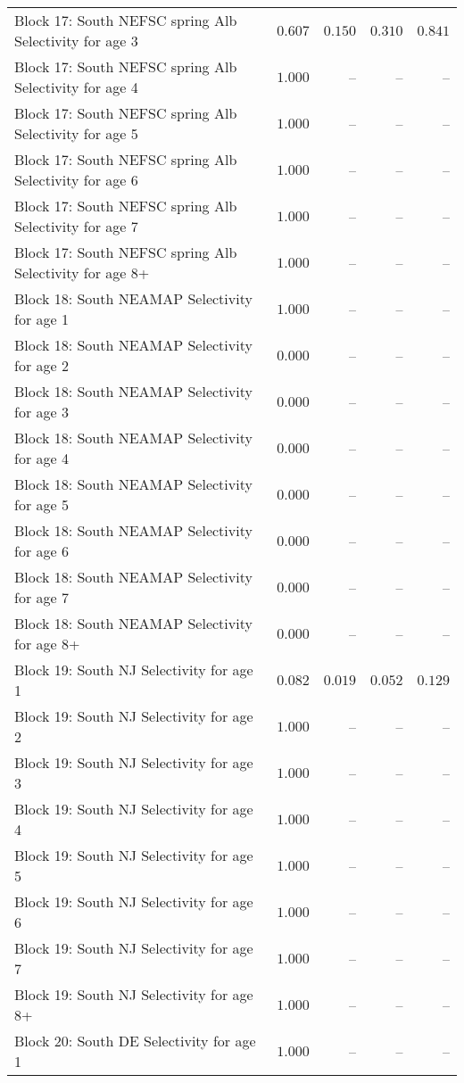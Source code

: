 \documentclass[
]{article}
\begin{document}
\begin{landscape}
\begin{longtable}[t]{lrrrr}
Block 17: South NEFSC spring Alb Selectivity for age 3 & $0.607$ & $0.150$ & $0.310$ & $0.841$\\
Block 17: South NEFSC spring Alb Selectivity for age 4 & $1.000$ & -- & -- & --\\
Block 17: South NEFSC spring Alb Selectivity for age 5 & $1.000$ & -- & -- & --\\
\addlinespace
Block 17: South NEFSC spring Alb Selectivity for age 6 & $1.000$ & -- & -- & --\\
Block 17: South NEFSC spring Alb Selectivity for age 7 & $1.000$ & -- & -- & --\\
Block 17: South NEFSC spring Alb Selectivity for age 8+ & $1.000$ & -- & -- & --\\
Block 18: South NEAMAP Selectivity for age 1 & $1.000$ & -- & -- & --\\
Block 18: South NEAMAP Selectivity for age 2 & $0.000$ & -- & -- & --\\
\addlinespace
Block 18: South NEAMAP Selectivity for age 3 & $0.000$ & -- & -- & --\\
Block 18: South NEAMAP Selectivity for age 4 & $0.000$ & -- & -- & --\\
Block 18: South NEAMAP Selectivity for age 5 & $0.000$ & -- & -- & --\\
Block 18: South NEAMAP Selectivity for age 6 & $0.000$ & -- & -- & --\\
Block 18: South NEAMAP Selectivity for age 7 & $0.000$ & -- & -- & --\\
\addlinespace
Block 18: South NEAMAP Selectivity for age 8+ & $0.000$ & -- & -- & --\\
Block 19: South NJ Selectivity for age 1 & $0.082$ & $0.019$ & $0.052$ & $0.129$\\
Block 19: South NJ Selectivity for age 2 & $1.000$ & -- & -- & --\\
Block 19: South NJ Selectivity for age 3 & $1.000$ & -- & -- & --\\
Block 19: South NJ Selectivity for age 4 & $1.000$ & -- & -- & --\\
\addlinespace
Block 19: South NJ Selectivity for age 5 & $1.000$ & -- & -- & --\\
Block 19: South NJ Selectivity for age 6 & $1.000$ & -- & -- & --\\
Block 19: South NJ Selectivity for age 7 & $1.000$ & -- & -- & --\\
Block 19: South NJ Selectivity for age 8+ & $1.000$ & -- & -- & --\\
Block 20: South DE Selectivity for age 1 & $1.000$ & -- & -- & --\\

\end{longtable}
\end{landscape}
\end{document}
